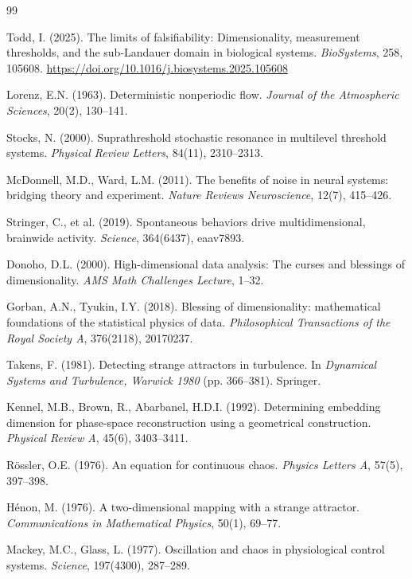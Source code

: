 \documentclass[12pt]{article}
\begin{document}
\begin{thebibliography}{99}

Todd, I. (2025). The limits of falsifiability: Dimensionality, measurement thresholds, and the sub-Landauer domain in biological systems. \textit{BioSystems}, 258, 105608. \url{https://doi.org/10.1016/j.biosystems.2025.105608}

Lorenz, E.N. (1963). Deterministic nonperiodic flow. \textit{Journal of the Atmospheric Sciences}, 20(2), 130--141.

Stocks, N. (2000). Suprathreshold stochastic resonance in multilevel threshold systems. \textit{Physical Review Letters}, 84(11), 2310--2313.

McDonnell, M.D., Ward, L.M. (2011). The benefits of noise in neural systems: bridging theory and experiment. \textit{Nature Reviews Neuroscience}, 12(7), 415--426.

Stringer, C., et al. (2019). Spontaneous behaviors drive multidimensional, brainwide activity. \textit{Science}, 364(6437), eaav7893.

Donoho, D.L. (2000). High-dimensional data analysis: The curses and blessings of dimensionality. \textit{AMS Math Challenges Lecture}, 1--32.

Gorban, A.N., Tyukin, I.Y. (2018). Blessing of dimensionality: mathematical foundations of the statistical physics of data. \textit{Philosophical Transactions of the Royal Society A}, 376(2118), 20170237.

Takens, F. (1981). Detecting strange attractors in turbulence. In \textit{Dynamical Systems and Turbulence, Warwick 1980} (pp. 366--381). Springer.

Kennel, M.B., Brown, R., Abarbanel, H.D.I. (1992). Determining embedding dimension for phase-space reconstruction using a geometrical construction. \textit{Physical Review A}, 45(6), 3403--3411.

Rössler, O.E. (1976). An equation for continuous chaos. \textit{Physics Letters A}, 57(5), 397--398.

Hénon, M. (1976). A two-dimensional mapping with a strange attractor. \textit{Communications in Mathematical Physics}, 50(1), 69--77.

Mackey, M.C., Glass, L. (1977). Oscillation and chaos in physiological control systems. \textit{Science}, 197(4300), 287--289.

\end{thebibliography}
\end{document}
